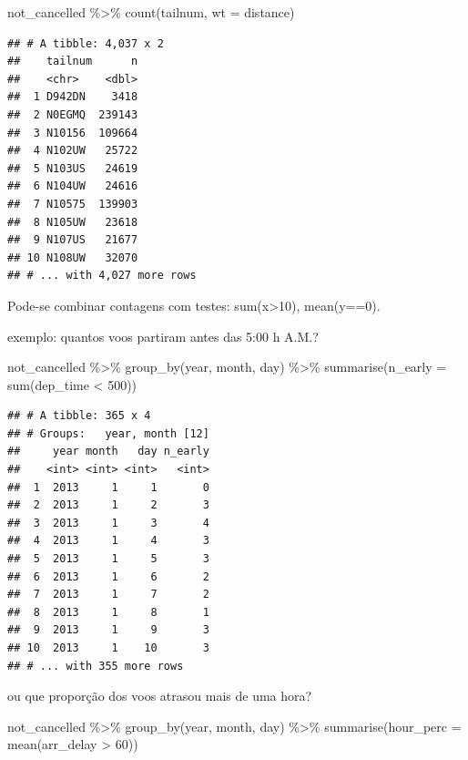 \documentclass[
]{article}
\newenvironment{Shaded}{\begin{snugshade}}{\end{snugshade}}
\newcommand{\AttributeTok}[1]{\textcolor[rgb]{0.77,0.63,0.00}{#1}}
\newcommand{\DecValTok}[1]{\textcolor[rgb]{0.00,0.00,0.81}{#1}}
\newcommand{\FunctionTok}[1]{\textcolor[rgb]{0.00,0.00,0.00}{#1}}
\newcommand{\NormalTok}[1]{#1}
\newcommand{\SpecialCharTok}[1]{\textcolor[rgb]{0.00,0.00,0.00}{#1}}
\begin{document}
\begin{Shaded}
\begin{Highlighting}[]
\NormalTok{not\_cancelled }\SpecialCharTok{\%\textgreater{}\%} 
  \FunctionTok{count}\NormalTok{(tailnum, }\AttributeTok{wt =}\NormalTok{ distance)}
\end{Highlighting}
\end{Shaded}

\begin{verbatim}
## # A tibble: 4,037 x 2
##    tailnum      n
##    <chr>    <dbl>
##  1 D942DN    3418
##  2 N0EGMQ  239143
##  3 N10156  109664
##  4 N102UW   25722
##  5 N103US   24619
##  6 N104UW   24616
##  7 N10575  139903
##  8 N105UW   23618
##  9 N107US   21677
## 10 N108UW   32070
## # ... with 4,027 more rows
\end{verbatim}

Pode-se combinar contagens com testes: sum(x\textgreater10), mean(y==0).

exemplo: quantos voos partiram antes das 5:00 h A.M.?

\begin{Shaded}
\begin{Highlighting}[]
\NormalTok{not\_cancelled }\SpecialCharTok{\%\textgreater{}\%} 
  \FunctionTok{group\_by}\NormalTok{(year, month, day) }\SpecialCharTok{\%\textgreater{}\%} 
  \FunctionTok{summarise}\NormalTok{(}\AttributeTok{n\_early =} \FunctionTok{sum}\NormalTok{(dep\_time }\SpecialCharTok{\textless{}} \DecValTok{500}\NormalTok{))}
\end{Highlighting}
\end{Shaded}

\begin{verbatim}
## # A tibble: 365 x 4
## # Groups:   year, month [12]
##     year month   day n_early
##    <int> <int> <int>   <int>
##  1  2013     1     1       0
##  2  2013     1     2       3
##  3  2013     1     3       4
##  4  2013     1     4       3
##  5  2013     1     5       3
##  6  2013     1     6       2
##  7  2013     1     7       2
##  8  2013     1     8       1
##  9  2013     1     9       3
## 10  2013     1    10       3
## # ... with 355 more rows
\end{verbatim}

ou que proporção dos voos atrasou mais de uma hora?

\begin{Shaded}
\begin{Highlighting}[]
\NormalTok{not\_cancelled }\SpecialCharTok{\%\textgreater{}\%} 
  \FunctionTok{group\_by}\NormalTok{(year, month, day) }\SpecialCharTok{\%\textgreater{}\%} 
  \FunctionTok{summarise}\NormalTok{(}\AttributeTok{hour\_perc =} \FunctionTok{mean}\NormalTok{(arr\_delay }\SpecialCharTok{\textgreater{}} \DecValTok{60}\NormalTok{))}
\end{Highlighting}
\end{Shaded}
\end{document}
